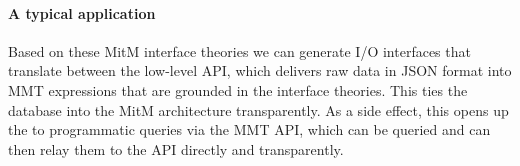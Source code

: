 \paragraph{A typical application}
Based on these MitM interface theories we can generate I/O interfaces that translate
between the low-level \LMFDB API, which delivers raw \Mongo data in JSON format into MMT
expressions that are grounded in the interface theories. This ties the \LMFDB database
into the MitM architecture transparently. As a side effect, this opens up the \LMFDB to
programmatic queries via the MMT API, which can be queried and can then relay them to the
\LMFDB API directly and transparently.



